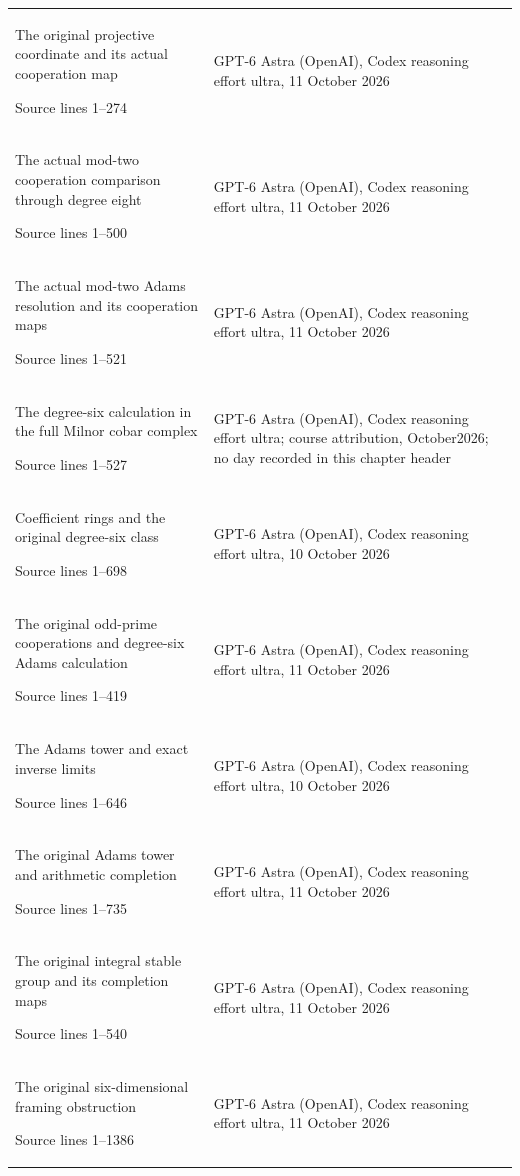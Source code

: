 \begin{longtable}{@{}p{61mm}p{87mm}@{}}
The original projective coordinate and its actual cooperation map\par Source lines 1–274 & GPT-6 Astra (OpenAI),\allowbreak{} Codex reasoning effort ultra,\allowbreak{} 11 October 2026\\
The actual mod-two cooperation comparison through degree eight\par Source lines 1–500 & GPT-6 Astra (OpenAI),\allowbreak{} Codex reasoning effort ultra,\allowbreak{} 11 October 2026\\
The actual mod-two Adams resolution and its cooperation maps\par Source lines 1–521 & GPT-6 Astra (OpenAI),\allowbreak{} Codex reasoning effort ultra,\allowbreak{} 11 October 2026\\
The degree-six calculation in the full Milnor cobar complex\par Source lines 1–527 & GPT-6 Astra (OpenAI),\allowbreak{} Codex reasoning effort ultra; course attribution,\allowbreak{} October2026; no day recorded in this chapter header\\
Coefficient rings and the original degree-six class\par Source lines 1–698 & GPT-6 Astra (OpenAI),\allowbreak{} Codex reasoning effort ultra,\allowbreak{} 10 October 2026\\
The original odd-prime cooperations and degree-six Adams calculation\par Source lines 1–419 & GPT-6 Astra (OpenAI),\allowbreak{} Codex reasoning effort ultra,\allowbreak{} 11 October 2026\\
The Adams tower and exact inverse limits\par Source lines 1–646 & GPT-6 Astra (OpenAI),\allowbreak{} Codex reasoning effort ultra,\allowbreak{} 10 October 2026\\
The original Adams tower and arithmetic completion\par Source lines 1–735 & GPT-6 Astra (OpenAI),\allowbreak{} Codex reasoning effort ultra,\allowbreak{} 11 October 2026\\
The original integral stable group and its completion maps\par Source lines 1–540 & GPT-6 Astra (OpenAI),\allowbreak{} Codex reasoning effort ultra,\allowbreak{} 11 October 2026\\
The original six-dimensional framing obstruction\par Source lines 1–1386 & GPT-6 Astra (OpenAI),\allowbreak{} Codex reasoning effort ultra,\allowbreak{} 11 October 2026\\

\end{longtable}
